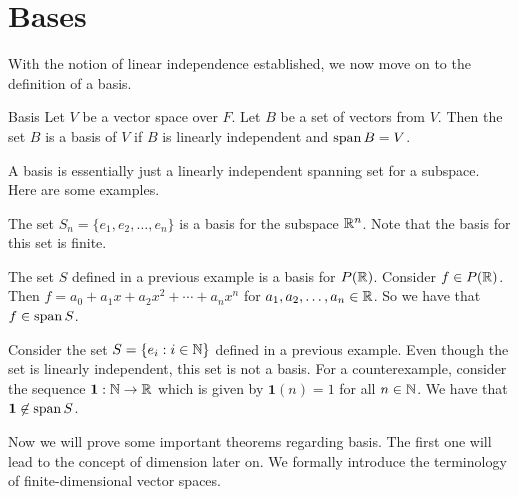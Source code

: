 \documentclass[main.tex]{subfiles}
\begin{document}
    \section{Bases}
    With the notion of linear independence established, we now move on to the definition of a basis. 
    \begin{defn}{Basis}{}
        Let $V$ be a vector space over $F$. Let $B$ be a set of vectors from $V$. Then the set $B$ is a basis of $V$ if $B$ is linearly independent and $\operatorname{span} B = V$. 
    \end{defn}
    A basis is essentially just a linearly independent spanning set for a subspace. Here are some examples. 

    \begin{example}{}{}
        The set $S_n = \{e_1, e_2, \dots, e_n\}$ is a basis for the subspace $\mathbb{R}^n$. Note that the basis for this set is finite. \bigbreak 

        The set $S$ defined in a previous example is a basis for $P(\mathbb{R})$. Consider $f\in P(\mathbb{R})$. Then $f = a_0 + a_1x + a_2x^2 + \cdots + a_nx^n$ for $a_1, a_2, \dots, a_n \in \mathbb{R}$. So we have that $f\in \operatorname{span} S$. 
    \end{example}

    \begin{example}{}{}
        Consider the set $S = \{e_i : i\in \mathbb{N}\}$ defined in a previous example. Even though the set is linearly independent, this set is not a basis. For a counterexample, consider the sequence $\mathbf{1} : \mathbb{N} \to \mathbb{R}$ which is given by $\mathbf{1}(n) = 1$ for all $n\in \mathbb{N}$. We have that $\mathbf{1} \not\in \operatorname{span} S$. 
    \end{example}
    Now we will prove some important theorems regarding basis. The first one will lead to the concept of dimension later on. We formally introduce the terminology of finite-dimensional vector spaces.
\end{document}
